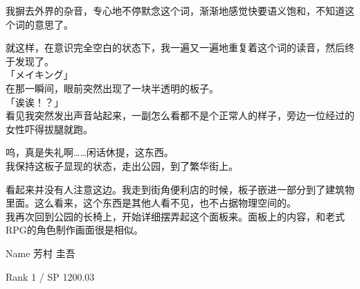 我摒去外界的杂音，专心地不停默念这个词，渐渐地感觉快要语义饱和，不知道这个词的意思了。

就这样，在意识完全空白的状态下，我一遍又一遍地重复着这个词的读音，然后终于发现了。\\

「メイキング」\\

在那一瞬间，眼前突然出现了一块半透明的板子。\\

「诶诶！？」\\

看见我突然发出声音站起来，一副怎么看都不是个正常人的样子，旁边一位经过的女性吓得拔腿就跑。

呜，真是失礼啊……闲话休提，这东西。\\

我保持这板子显现的状态，走出公园，到了繁华街上。

看起来并没有人注意这边。我走到街角便利店的时候，板子嵌进一部分到了建筑物里面。这么看来，这个东西是其他人看不见，也不占据物理空间的。\\

我再次回到公园的长椅上，开始详细摆弄起这个面板来。面板上的内容，和老式RPG的角色制作画面很是相似。\\

\cardline

  Name 芳村 圭吾

  Rank 1 / SP 1200.03

